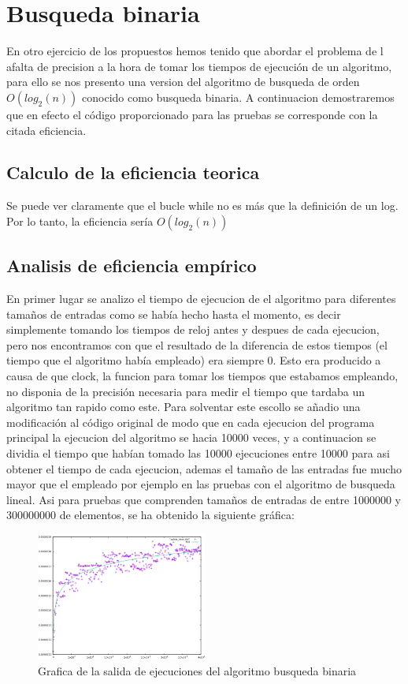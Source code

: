 \section{Busqueda binaria}
En otro ejercicio de los propuestos hemos tenido que abordar el problema de l afalta de precision a la hora de tomar los tiempos de ejecución de un algoritmo, para ello se nos presento una version del algoritmo de busqueda de orden $O(log_{2}(n))$ conocido como busqueda binaria. A continuacion demostraremos que en efecto el código proporcionado para las pruebas se corresponde con la citada eficiencia.

\subsection{Calculo de la eficiencia teorica}

Se puede ver claramente que el bucle while no es más que la definición de un log. Por lo tanto, la eficiencia sería $O(log_{2}(n))$

\subsection{Analisis de eficiencia empírico}

En primer lugar se analizo el tiempo de ejecucion de el algoritmo para diferentes tamaños de entradas como se había hecho hasta el momento, es decir simplemente tomando los tiempos de reloj antes y despues de cada ejecucion, pero nos encontramos con que el resultado de la diferencia de estos tiempos (el tiempo que el algoritmo había empleado) era siempre 0. Esto era producido a causa de que clock, la funcion para tomar los tiempos que estabamos empleando, no disponia de la precisión necesaria para medir el tiempo que tardaba un algoritmo tan rapido como este. Para solventar este escollo se añadio una modificación al código original de modo que en cada ejecucion del programa principal la ejecucion del algoritmo se hacia 10000 veces, y a continuacion se dividia el tiempo que habían tomado las 10000 ejecuciones entre 10000 para asi obtener el tiempo de cada ejecucion, ademas el tamaño de las entradas fue mucho mayor que el empleado por ejemplo en las pruebas con el algoritmo de busqueda lineal. Asi para pruebas que comprenden tamaños de entradas de entre 1000000 y 300000000 de elementos, se ha obtenido la siguiente gráfica:

\begin{figure}[ht]
  \centering
  \includegraphics[width=0.5\textwidth]{./Imagenes/binaria_ajustada.png}
  \caption{Grafica de la salida de ejecuciones del algoritmo busqueda binaria}
\end{figure}

